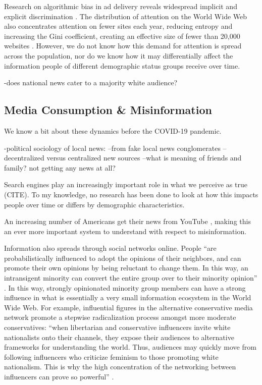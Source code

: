\documentclass[11pt]{article}
\begin{document}
Research on algorithmic bias in ad delivery reveals widespread implicit and explicit discrimination \citep{Sweeney2013}. The distribution of attention on the World Wide Web also concentrates attention on fewer sites each year, reducing entropy and increasing the Gini coefficient, creating an effective size of fewer than 20,000 websites \citep{McCurley2007}. However, we do not know how this demand for attention is spread across the population, nor do we know how it may differentially affect the information people of different demographic status groups receive over time.



-does national news cater to a majority white audience?


\subsection{Media Consumption \& Misinformation}

We know a bit about these dynamics before the COVID-19 pandemic.

-political sociology of local news:
--from fake local news conglomerates
--decentralized versus centralized new sources
--what is meaning of friends and family? not getting any news at all?

Search engines play an increasingly important role in what we perceive as true (CITE). To my knowledge, no research has been done to look at how this impacts people over time or differs by demographic characteristics.

An increasing number of Americans get their news from YouTube
\cite{Shearer2017}, making this an ever more important system to understand with
respect to misinformation.

Information also spreads through social networks online. People ``are probabilistically influenced to adopt the opinions of their neighbors, and can promote their own opinions by being reluctant to change them. In this way, an intransigent minority can convert the entire group over to their minority opinion'' \citep{West2011}. In this way, strongly opinionated minority group members can have a strong influence in what is essentially a very small information ecosystem in the World Wide Web. For example, influential figures in the alternative conservative media network promote a stepwise radicalization process amongst more moderate conservatives: ``when libertarian and conservative influencers invite white nationalists onto their channels, they expose their audiences to alternative frameworks for understanding the world. Thus, audiences may quickly move from following influencers who criticize feminism to those promoting white nationalism. This is why the high concentration of the networking between influencers can prove so powerful'' \citep{Lewis}.
\end{document}
